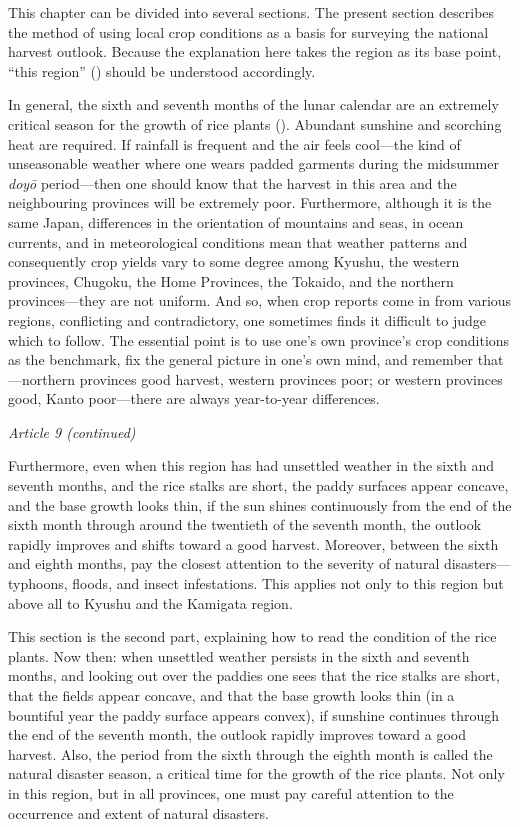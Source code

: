 \commentary
This chapter can be divided into several sections. The present section
describes the method of using local crop conditions as a basis for
surveying the national harvest outlook. Because the explanation here
takes the  region as its base point, ``this region''
() should be understood accordingly.

In general, the sixth and seventh months of the lunar calendar are an
extremely critical season for the growth of rice plants ().
Abundant sunshine and scorching heat are required. If rainfall is
frequent and the air feels cool---the kind of unseasonable weather where
one wears padded garments during the midsummer \textit{doy\=o}
period---then one should know that the harvest in this area and the
neighbouring provinces will be extremely poor. Furthermore, although it
is the same Japan, differences in the orientation of mountains and seas,
in ocean currents, and in meteorological conditions mean that weather
patterns and consequently crop yields vary to some degree among Kyushu,
the western provinces, Chugoku, the Home Provinces, the Tokaido, and the
northern provinces---they are not uniform. And so, when crop reports come
in from various regions, conflicting and contradictory, one sometimes
finds it difficult to judge which to follow. The essential point is to
use one's own province's crop conditions as the benchmark, fix the
general picture in one's own mind, and remember that---northern provinces
good harvest, western provinces poor; or western provinces good, Kanto
poor---there are always year-to-year differences.

\begin{sokyubox}
{\small\itshape\color{sokyubar} Article 9 (continued)}

\medskip
Furthermore, even when this region has had unsettled weather in the sixth
and seventh months, and the rice stalks are short, the paddy surfaces
appear concave, and the base growth looks thin, if the sun shines
continuously from the end of the sixth month through around the twentieth
of the seventh month, the outlook rapidly improves and shifts toward a
good harvest. Moreover, between the sixth and eighth months, pay the
closest attention to the severity of natural disasters---typhoons,
floods, and insect infestations. This applies not only to this region
but above all to Kyushu and the Kamigata region.
\end{sokyubox}

This section is the second part, explaining how to read the condition of
the rice plants. Now then: when unsettled weather persists in the sixth
and seventh months, and looking out over the paddies one sees that the
rice stalks are short, that the fields appear concave, and that the base
growth looks thin (in a bountiful year the paddy surface appears convex),
if sunshine continues through the end of the seventh month, the outlook
rapidly improves toward a good harvest. Also, the period from the sixth
through the eighth month is called the natural disaster season, a
critical time for the growth of the rice plants. Not only in this
region, but in all provinces, one must pay careful attention to the
occurrence and extent of natural disasters.

